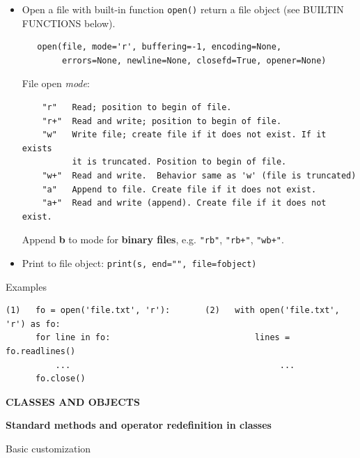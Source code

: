 \documentclass[9pt,a4wide]{extarticle}
\begin{document}
\medskip

\begin{itemize}

\item Open a file with built-in function {\tt open()} return a file object
  (see BUILTIN FUNCTIONS below).

\begin{verbatim}
   open(file, mode='r', buffering=-1, encoding=None,
        errors=None, newline=None, closefd=True, opener=None) 
\end{verbatim}

   File open {\em mode}:

\begin{verbatim}
    "r"   Read; position to begin of file.
    "r+"  Read and write; position to begin of file.
    "w"   Write file; create file if it does not exist. If it exists 
          it is truncated. Position to begin of file.
    "w+"  Read and write.  Behavior same as 'w' (file is truncated)
    "a"   Append to file. Create file if it does not exist.
    "a+"  Read and write (append). Create file if it does not exist.
\end{verbatim}

   Append {\bf b} to mode for {\bf binary files}, e.g. {\tt "rb"}, {\tt "rb+"}, 
   {\tt "wb+"}.

\item Print to file object: {\tt print(s, end="", file=fobject)}

\end{itemize}

\medskip

Examples

\begin{verbatim}
(1)   fo = open('file.txt', 'r'):       (2)   with open('file.txt', 'r') as fo:
      for line in fo:                             lines = fo.readlines()         
          ...                                          ...
      fo.close()
\end{verbatim}




\bigskip
{\LARGE\bf CLASSES AND OBJECTS}

\bigskip

{\bf Standard methods and operator redefinition in classes}

\bigskip

Basic customization
\end{document}

